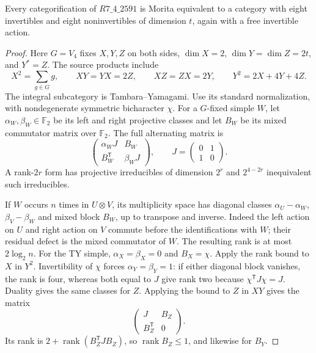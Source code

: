 \begin{proposition}\label{prop:twisted-v4}
Every categorification of $R7\_4\_2591$ is Morita equivalent to a
category with eight invertibles and eight noninvertibles of dimension
$t$, again with a free invertible action.
\end{proposition}
\begin{proof}
Here $G=V_4$ fixes $X,Y,Z$ on both sides, $\dim X=2$,
$\dim Y=\dim Z=2t$, and $Y^*=Z$. The source products include
\[
 X^2=\sum_{g\in G}g,\qquad XY=YX=2Z,\qquad
 XZ=ZX=2Y,\qquad Y^2=2X+4Y+4Z.
\]
The integral subcategory is Tambara--Yamagami. Use its standard
normalization, with nondegenerate symmetric bicharacter $\chi$.
For a $G$-fixed simple $W$, let $\alpha_W,\beta_W\in\mathbb F_2$
be its left and right projective classes and let $B_W$ be its mixed
commutator matrix over $\mathbb F_2$. The full alternating matrix is
\[
 \begin{pmatrix}\alpha_WJ&B_W\\B_W^{\mathsf T}&\beta_WJ\end{pmatrix},
 \qquad J=\begin{pmatrix}0&1\\1&0\end{pmatrix}.
\]
A rank-$2r$ form has projective irreducibles of dimension $2^r$ and
$2^{4-2r}$ inequivalent such irreducibles.

If $W$ occurs $n$ times in $U\otimes V$, its multiplicity space has
diagonal classes $\alpha_U-\alpha_W$, $\beta_V-\beta_W$ and mixed
block $B_W$, up to transpose and inverse. Indeed the left action on
$U$ and right action on $V$ commute before the identifications with
$W$; their residual defect is the mixed commutator of $W$.
The resulting rank is at most $2\log_2n$.
For the TY simple, $\alpha_X=\beta_X=0$ and $B_X=\chi$.
Apply the rank bound to $X$ in $Y^2$. Invertibility of $\chi$ forces
$\alpha_Y=\beta_Y=1$: if either diagonal block vanishes, the rank
is four, whereas both equal to $J$ give rank two because
$\chi^{\mathsf T}J\chi=J$.
Duality gives the same classes for $Z$. Applying the bound to $Z$
in $XY$ gives the matrix
\[
 \begin{pmatrix}J&B_Z\\B_Z^{\mathsf T}&0\end{pmatrix}.
\]
Its rank is $2+\operatorname{rank}(B_Z^{\mathsf T}JB_Z)$, so
$\operatorname{rank}B_Z\leq1$, and likewise for $B_Y$.


\end{proof}
